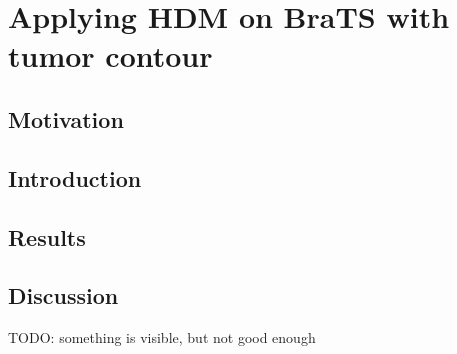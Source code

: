 \section{Applying HDM on BraTS with tumor contour}

\subsection{Motivation}
\subsection{Introduction}

\subsection{Results}

\subsection{Discussion}
TODO: something is visible, but not good enough


